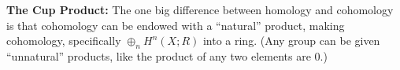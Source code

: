 \def\ccy{\Cyan}		  %
\def\cpb{\ProcessBlue}	  %
\def\csb{\SkyBlue}	  %
\def\ctu{\Turquoise}	  %
\def\ctb{\TealBlue}	  %
\def\caq{\Aquamarine}	  %
\def\cbg{\BlueGreen}	  %
\def\cem{\Emerald}	  %
\def\csg{\SeaGreen}	  %
\def\cgg{\Green}	  %
\def\cfg{\ForestGreen}	  %
\def\cpg{\PineGreen}	  %
\def\clg{\LimeGreen}	  %
\def\cyg{\YellowGreen}	  %
\def\cspg{\SpringGreen}	  %
\def\cog{\OliveGreen}	  %
\def\pars{\RawSienna}	  %
\def\cse{\Sepia}		  %
\def\cbr{\Brown}		  %
\def\cta{\Tan}		  %
\def\cgr{\Gray}		  %
\def\cbl{\Black}		  %
\def\cwh{\White}		  %


\loadmsbm



\def\ctln{\centerline}
\def\u{\underbar}
\def\ssk{\smallskip}
\def\msk{\medskip}
\def\bsk{\bigskip}
\def\hsk{\hskip.1in}
\def\hhsk{\hskip.2in}
\def\dsl{\displaystyle}
\def\hskp{\hskip1.5in}

\def\lra{$\Leftrightarrow$ }
\def\ra{\rightarrow}
\def\mpto{\logmapsto}
\def\pu{\pi_1}
\def\mpu{$\pi_1$}
\def\sig{\Sigma}
\def\msig{$\Sigma$}
\def\ep{\epsilon}
\def\sset{\subseteq}
\def\del{\partial}
\def\inv{^{-1}}
\def\wtl{\widetilde}
\def\del{\partial}
\def\delp{\partial^\prime}
\def\delpp{\partial^{\prime\prime}}
\def\sgn{{\roman{sgn}}}
\def\wtih{\widetilde{H}}
\def\bbz{{\Bbb Z}}
\def\bbr{{\Bbb R}}
\def\bbq{{\Bbb Q}}
\def\bbc{{\Bbb C}}
\def\hdsk{\hskip.7in}
\def\hdskb{\hskip.9in}
\def\hdskc{\hskip1.1in}
\def\hdskd{\hskip1.3in}
\def\Hom{\text{Hom}}
\def\Ext{\text{Ext}}
\def\larr{\leftarrow}



{\bf The Cup Product:} The one big difference between homology and cohomology is that
cohomology can be endowed with a ``natural'' product, making cohomology, specifically
$\oplus_n H^n(X;R)$ into a ring. (Any group can be given ``unnatural'' products, like the
product of any two elements are $0$.) 

